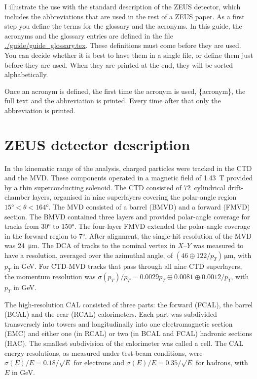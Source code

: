 I illustrate the use with the standard description of the ZEUS
detector, which includes the abbreviations that are used in the rest
of a ZEUS paper.  As a first step you define the terms for the
glossary and the acronyms.  In this guide, the acronyms and the
glossary entries are defined in the file
\url{./guide/guide_glossary.tex}. These definitions must come before
they are used. You can decide whether it is best to have them in a
single file, or define them just before they are used. When they are
printed at the end, they will be sorted alphabetically.

Once an acronym is defined, the first time the acronym is used,
\{acronym\}, the full text and the abbreviation is
printed. Every time after that only the abbreviation is printed.

\section{ZEUS detector description}
\label{sec:app:glossary:zeus}

In the kinematic range of the analysis, charged particles were tracked
in the \gls{CTD} and the
\gls{MVD}. These components operated in a magnetic
field of \SI{1.43}{\tesla} provided by a thin superconducting solenoid. The
\gls{CTD} consisted of 72~cylindrical drift-chamber layers, organised in nine
superlayers covering the polar-angle region
$\ang{15} < \theta < \ang{164}$.
%
The \gls{MVD} consisted of a barrel (BMVD) and a forward (FMVD)
section. The BMVD contained three layers and provided polar-angle
coverage for tracks from \ang{30} to \ang{150}. The four-layer FMVD
extended the polar-angle coverage in the forward region to
\ang{7}. After alignment, the single-hit resolution of the MVD was
\SI{24}{\micro\metre}. The \gls{DCA} of tracks to the nominal vertex in
$X$--$Y$ was measured to have a resolution, averaged over the
azimuthal angle, of $(46 \oplus 122 /
  p_{T})\,\si{\micro\metre}$, with $p_{T}$ in \si{\GeV}.  For \gls{CTD}-\gls{MVD} tracks
that pass through all nine \gls{CTD} superlayers, the momentum
resolution was $\sigma(p_{T})/p_{T} = 0.0029 p_{T} \oplus 0.0081
\oplus 0.0012/p_{T}$, with $p_{T}$ in \si{\GeV}.

The high-resolution \gls{CAL} consisted of three parts: the forward
(FCAL), the barrel (BCAL) and the rear (RCAL) calorimeters. Each part
was subdivided transversely into towers and longitudinally into one
electromagnetic section (EMC) and either one (in RCAL) or two (in BCAL
and FCAL) hadronic sections (HAC). The smallest subdivision of the
calorimeter was called a cell.  The \gls{CAL} energy resolutions, as
measured under test-beam conditions, were $\sigma(E)/E=0.18/\sqrt{E}$
for electrons and $\sigma(E)/E=0.35/\sqrt{E}$ for hadrons, with $E$ in
\si{\GeV}.  \clearpage

